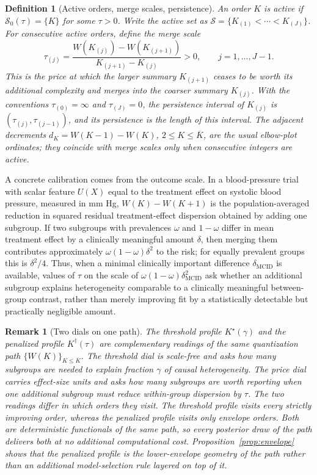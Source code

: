 \documentclass[11pt]{article}
\newtheorem{definition}{Definition}
\newtheorem{remark}{Remark}
\newcommand{\calS}{\mathcal S}
\begin{document}
\begin{definition}[Active orders, merge scales, persistence]\label{def:merge}
An order $K$ is active if $\calS_0(\tau)=\{K\}$ for some $\tau>0$.  Write the active set as $\calS=\{K_{(1)}<\cdots<K_{(J)}\}$.
For consecutive active orders, define the merge scale
\begin{equation*}
\tau_{(j)}
=
\frac{W(K_{(j)})-W(K_{(j+1)})}
{K_{(j+1)}-K_{(j)}}>0,
\qquad j=1,\dots,J-1.
\end{equation*}
This is the price at which the larger summary $K_{(j+1)}$ ceases to be worth its additional complexity and merges into the coarser summary $K_{(j)}$.  With the conventions $\tau_{(0)}=\infty$ and $\tau_{(J)}=0$, the persistence interval of $K_{(j)}$ is $(\tau_{(j)},\tau_{(j-1)})$, and its persistence is the length of this interval.  The adjacent decrements $d_K=W(K-1)-W(K)$, $2\le K\le\overline K$, are the usual elbow-plot ordinates; they coincide with merge scales only when consecutive integers are active.
\end{definition}

A concrete calibration comes from the outcome scale.  In a blood-pressure trial with scalar feature $U(X)$ equal to the treatment effect on systolic blood pressure, measured in mm Hg, $W(K)-W(K+1)$ is the population-averaged reduction in squared residual treatment-effect dispersion obtained by adding one subgroup.  If two subgroups with prevalences $\omega$ and $1-\omega$ differ in mean treatment effect by a clinically meaningful amount $\delta$, then merging them contributes approximately $\omega(1-\omega)\delta^2$ to the risk; for equally prevalent groups this is $\delta^2/4$.  Thus, when a minimal clinically important difference $\delta_{\mathrm{MCID}}$ is available, values of $\tau$ on the scale of $\omega(1-\omega)\delta_{\mathrm{MCID}}^2$ ask whether an additional subgroup explains heterogeneity comparable to a clinically meaningful between-group contrast, rather than merely improving fit by a statistically detectable but practically negligible amount.

\begin{remark}[Two dials on one path]\label{rem:twodials}
The threshold profile $K^\star(\gamma)$ and the penalized profile $K^\dagger(\tau)$ are complementary readings of the same quantization path $\{W(K)\}_{K\le\overline K}$.  The threshold dial is scale-free and asks how many subgroups are needed to explain fraction $\gamma$ of causal heterogeneity.  The price dial carries effect-size units and asks how many subgroups are worth reporting when one additional subgroup must reduce within-group dispersion by $\tau$.  The two readings differ in which orders they visit. The threshold profile visits every strictly improving order, whereas the penalized profile visits only envelope orders.  Both are deterministic functionals of the same path, so every posterior draw of the path delivers both at no additional computational cost.  Proposition~\ref{prop:envelope} shows that the penalized profile is the lower-envelope geometry of the path rather than an additional model-selection rule layered on top of it.
\end{remark}
\end{document}
